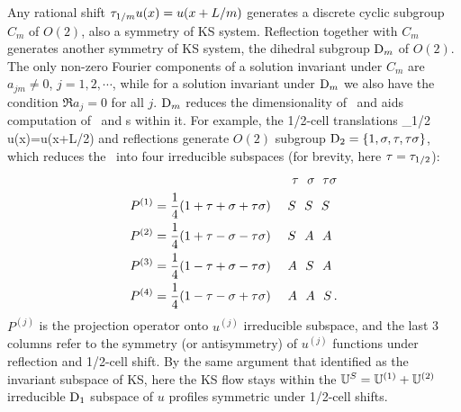 Any rational shift $ \tau_{1/m}u(x)=u(x+L/m)$ generates a discrete
cyclic subgroup $C_m$ of $O(2)$, also a symmetry of KS
system. Reflection together with $C_m$ generates another
symmetry of KS system, the dihedral subgroup $\textrm{D}_{m}$ of $O(2)$.
The only non-zero Fourier components of a solution invariant
under $C_m$ are $a_{jm} \neq 0$, $j =1,2,\cdots$, while for a
solution invariant under $\textrm{D}_{m}$ we also have the condition
$\Re a_j=0$ for all $j$.
$\textrm{D}_{m}$ reduces the dimensionality of \statesp\ and aids computation of
\eqva\ and \po s within it. For example, the 1/2-cell translations \beq
    \Shift_{1/2}\, u(x)=u(x+L/2)
and reflections generate $O(2)$
subgroup $\Dn{2} = \{1, \Refl,\Shift,\Shift\Refl\}$,
which
reduces the \statesp\ into four irreducible subspaces
(for brevity, here $\Shift = \Shift_{1/2}$):
\begin{align}
 & \qquad\qquad\qquad\qquad\qquad
              ~~~ \Shift ~~ \Refl  ~\;  \Shift\Refl
    \nnu\\
P^{(1)} &= \frac{1}{4} (1 + \Shift + \Refl + \Shift\Refl)
           ~~~~  S  ~~  S   ~~   S
    \nnu\\
P^{(2)} &= \frac{1}{4} (1 + \Shift - \Refl - \Shift\Refl)
            ~~~~  S  ~~  A   ~~   A
    \nnu\\
P^{(3)} &= \frac{1}{4} (1 - \Shift + \Refl - \Shift\Refl)
           ~~~~  A  ~~  S   ~~   A
     \label{ek_defn}\\
P^{(4)} &= \frac{1}{4} (1 - \Shift - \Refl + \Shift\Refl)
          ~~~~  A  ~~  A   ~~   S
\,.
    \nnu
\end{align}
$P^{(j)}$ is the projection operator onto
$u^{(j)}$ irreducible subspace, and the last 3 columns
refer to the symmetry (or antisymmetry) of
$u^{(j)}$ functions under reflection and
1/2-cell shift.
By the same argument that identified  as
the invariant subspace of KS, here the KS flow
stays within the
 $\mathbb{U}^S =  \mathbb{U}^{(1)}+ \mathbb{U}^{(2)}$
irreducible $\textrm{D}_{1}$ subspace of
$u$ profiles symmetric under 1/2-cell shifts.

